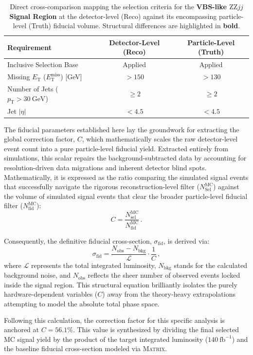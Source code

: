\begin{table}[!htbp]
    \centering
    \renewcommand{\arraystretch}{1.3}
    \begin{tabular}{l|c|c}
        \hline \hline
        \textbf{Requirement} & \textbf{Detector-Level (Reco)} & \textbf{Particle-Level (Truth)} \\
        \hline
        Inclusive Selection Base & Applied & Applied \\
        \hline
        Missing $E_{\text{T}}$ ($E_{\text{T}}^{\text{miss}}$) [GeV] & $> 150$ & \textbf{$> 130$} \\
        Number of Jets ($p_{\text{T}} > 30~\text{GeV}$) & $\geq 2$ & $\geq 2$ \\
        Jet $|\eta|$ &   $< 4.5$ & \textbf{$< 4.5$} \\
        \hline \hline
    \end{tabular}
    \caption{Direct cross-comparison mapping the selection criteria for the \textbf{VBS-like $\text{ZZ}jj$ Signal Region} at the detector-level (Reco) against its encompassing particle-level (Truth) fiducial volume. Structural differences are highlighted in \textbf{bold}.}
    \label{tab:reco_truth_vbs}
\end{table}

The fiducial parameters established here lay the groundwork for extracting the global correction factor, $C$, which mathematically scales the raw detector-level event count into a pure particle-level fiducial yield. Extracted entirely from simulations, this scalar repairs the background-subtracted data by accounting for resolution-driven data migrations and inherent detector blind spots. Mathematically, it is expressed as the ratio comparing the simulated signal events that successfully navigate the rigorous reconstruction-level filter ($N_{\text{Sel}}^{\text{MC}}$) against the volume of simulated signal events that clear the broader particle-level fiducial filter ($N_{\text{fid}}^{\text{MC}}$):
%
\begin{equation}
C = \frac{N_{\text{sel}}^{\text{MC}}}{N_{\text{fid}}^{\text{MC}}} \, .
\end{equation}

Consequently, the definitive fiducial cross-section, $\sigma_{\text{fid}}$, is derived via:
%
\begin{equation}
\sigma_{\text{fid}} = \frac{N_{\text{obs}} - N_{\text{bkg}}}{\mathcal{L}} \cdot \frac{1}{C} \, ,
\end{equation}
%
where $\mathcal{L}$ represents the total integrated luminosity, $N_{\text{bkg}}$ stands for the calculated background noise, and $N_{\text{obs}}$ reflects the sheer number of observed events locked inside the signal region. This structural equation brilliantly isolates the purely hardware-dependent variables ($C$) away from the theory-heavy extrapolations attempting to model the absolute total phase space.

Following this calculation, the correction factor for this specific analysis is anchored at $C = 56.1\%$. This value is synthesized by dividing the final selected MC signal yield by the product of the target integrated luminosity ($140~\text{fb}^{-1}$) and the baseline fiducial cross-section modeled via \textsc{Matrix}.


